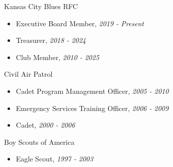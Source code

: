 
\Community
{Kansas City Blues RFC}
{\begin{itemize}
    \item Executive Board Member, \emph{2019 - Present}
    \item Treasurer, \emph{2018 - 2024}
    \item Club Member, \emph{2010 - 2025}
\end{itemize}}

\vspace*{0.05 in}

\Community
{Civil Air Patrol}
{\begin{itemize}
    \item Cadet Program Management Officer, \emph{2005 - 2010}
    \item Emergency Services Training Officer, \emph{2006 - 2009}
    \item Cadet, \emph{2000 - 2006}
\end{itemize}}

\vspace*{0.05 in}

\Community
{Boy Scouts of America}
{\begin{itemize}
    \item Eagle Scout, \emph{1997 - 2003}
\end{itemize}}